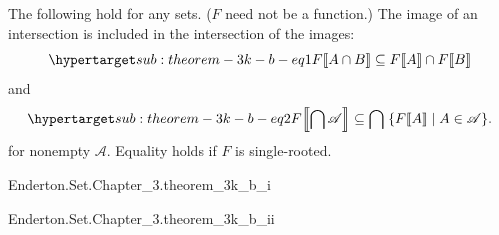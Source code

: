 \documentclass{report}
\begin{document}
\subsection{}%

  \begin{theorem}[3K(b)]
    The following hold for any sets. ($F$ need not be a function.)
    The image of an intersection is included in the intersection of the images:
      \begin{equation}
        \hyperlabel{sub:theorem-3k-b-eq1}
        \img{F}{A \cap B} \subseteq \img{F}{A} \cap \img{F}{B}
      \end{equation}
      and
      \begin{equation}
        \hyperlabel{sub:theorem-3k-b-eq2}
        \img{F}{\bigcap\mathscr{A}} \subseteq
          \bigcap\;\{\img{F}{A} \mid A \in \mathscr{A}\}.
      \end{equation}
      for nonempty $\mathscr{A}$.
    Equality holds if $F$ is single-rooted.
  \end{theorem}

    {Enderton.Set.Chapter\_3.theorem\_3k\_b\_i}

    {Enderton.Set.Chapter\_3.theorem\_3k\_b\_ii}
\end{document}
